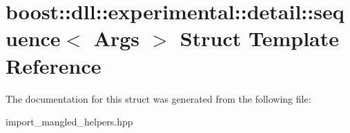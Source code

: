\hypertarget{a00266}{}\section{boost\+:\+:dll\+:\+:experimental\+:\+:detail\+:\+:sequence$<$ Args $>$ Struct Template Reference}
\label{a00266}


The documentation for this struct was generated from the following file\+:\begin{DoxyCompactItemize}
\item 
import\+\_\+mangled\+\_\+helpers.\+hpp\end{DoxyCompactItemize}
